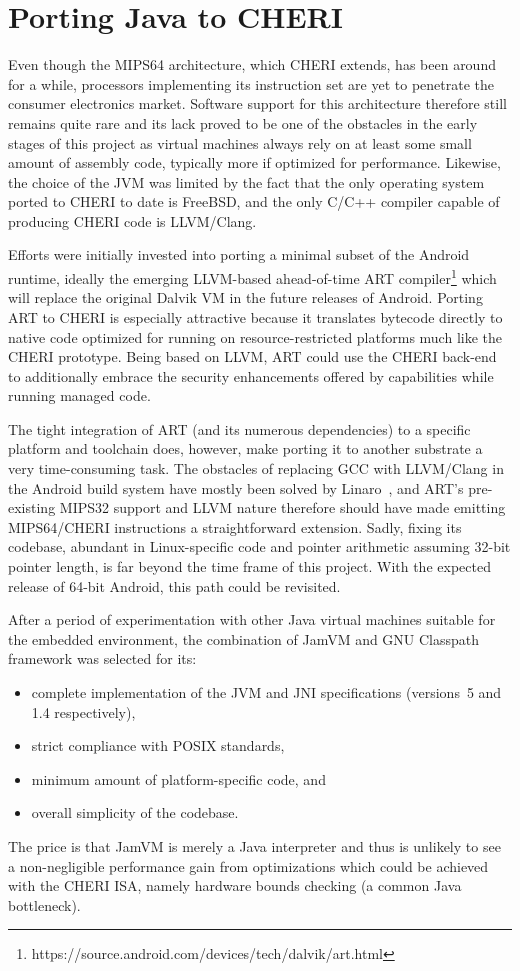 \documentclass[a4paper,12pt,twoside,openright]{report}
\begin{document}
\section{Porting Java to CHERI}

Even though the MIPS64 architecture, which CHERI extends, has been around for a while, processors implementing its instruction set are yet to penetrate the consumer electronics market. Software support for this architecture therefore still remains quite rare and its lack proved to be one of the obstacles in the early stages of this project as virtual machines always rely on at least some small amount of assembly code, typically more if optimized for performance. Likewise, the choice of the JVM was limited by the fact that the only operating system ported to CHERI to date is FreeBSD, and the only C/C++ compiler capable of producing CHERI code is LLVM/Clang. 

Efforts were initially invested into porting a minimal subset of the Android runtime, ideally the emerging LLVM-based ahead-of-time ART compiler\footnote{https://source.android.com/devices/tech/dalvik/art.html} which will replace the original Dalvik VM in the future releases of Android. Porting ART to CHERI is especially attractive because it translates bytecode directly to native code optimized for running on resource-restricted platforms much like the CHERI prototype. Being based on LLVM, ART could use the CHERI back-end to additionally embrace the security enhancements offered by capabilities while running managed code.

The tight integration of ART (and its numerous dependencies) to a specific platform and toolchain does, however, make porting it to another substrate a very time-consuming task. The obstacles of replacing GCC with LLVM{\slash}Clang in the Android build system have mostly been solved by Linaro~\cite{Linaro:AndroidWithClang}, and ART's pre-existing MIPS32 support and LLVM nature therefore should have made emitting MIPS64/CHERI instructions a straightforward extension. Sadly, fixing its codebase, abundant in Linux-specific code and pointer arithmetic assuming 32-bit pointer length, is far beyond the time frame of this project. With the expected release of 64-bit Android, this path could be revisited.

After a period of experimentation with other Java virtual machines suitable for the embedded environment, the combination of JamVM and GNU Classpath framework was selected for its:
\begin{itemize}
\item complete implementation of the JVM and JNI specifications (versions~5 and 1.4 respectively),
\item strict compliance with POSIX standards,
\item minimum amount of platform-specific code, and
\item overall simplicity of the codebase.
\end{itemize}
The price is that JamVM is merely a Java interpreter and thus is unlikely to see a non-negligible performance gain from optimizations which could be achieved with the CHERI ISA, namely hardware bounds checking (a common Java bottleneck).
\end{document}

